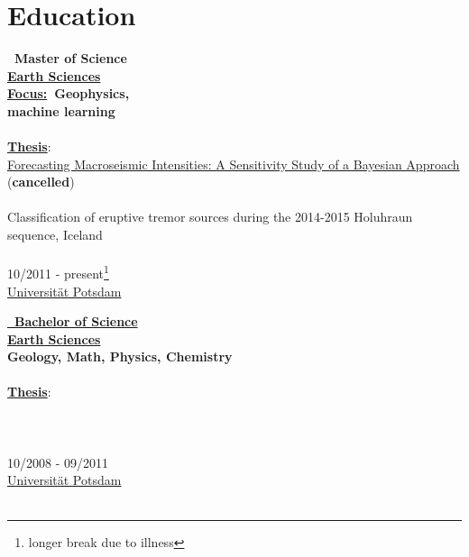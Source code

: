 \documentclass{article}
\begin{document}
\hfill
\vrule
\hfill
\begin{minipage}[t]{0.69\textwidth}
	\section*{\fontsize{18pt}{24pt}\selectfont \color{pblue} Education}
	\begin{minipage}{0.34\textwidth}
	\textbf{\color{pblue}\faHourglassHalf~Master of Science} \\
	\textbf{\underline{Earth Sciences}}\\
	\textbf{\underline{Focus:}~Geophysics, \\machine learning}\\\\
	\textbf{\underline{Thesis}}:\\
	\href{https://github.com/silvioschwarz/master-thesis}{Forecasting Macroseismic Intensities: A Sensitivity Study of a Bayesian Approach} (\textbf{cancelled})\\\\
	Classification of eruptive tremor sources during the 2014-2015 Holuhraun sequence, Iceland\\\\
		10/2011 - present\footnote{longer break due to illness}\\
	\href{https://www.uni-potsdam.de/}{\color{pblue}Universität Potsdam}
		\end{minipage}
		\hfill
		\begin{minipage}{0.3\textwidth}
	\textbf{\href{https://www.dropbox.com/s/297g1chiby8mrd3/Bachelor-Certificate.pdf?dl=0}{\color{pblue}\faGraduationCap~Bachelor of Science}}\\
	\textbf{\underline{Earth Sciences}}\\
	\textbf{Geology, Math, Physics, Chemistry}\\\\
	\textbf{\underline{Thesis}}:\\
	\href{https://www.dropbox.com/s/3kngo4hpb0c47ww/Bachelorarbeit.pdf?dl=0}{}\\\\\\
	{10/2008 - 09/2011}\\
\href{https://www.uni-potsdam.de/}{\color{pblue}Universität Potsdam}\\\\
		\end{minipage}

\end{minipage}
\end{document}
